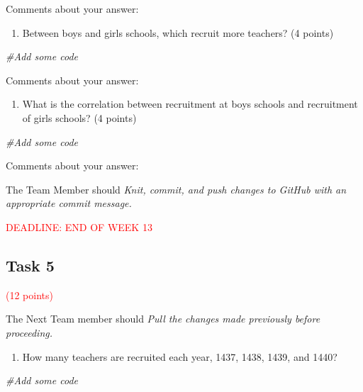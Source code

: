 \documentclass[
]{article}
\newenvironment{Shaded}{\begin{snugshade}}{\end{snugshade}}
\newcommand{\CommentTok}[1]{\textcolor[rgb]{0.56,0.35,0.01}{\textit{#1}}}
\providecommand{\tightlist}{%
  \setlength{\itemsep}{0pt}\setlength{\parskip}{0pt}}
\begin{document}
Comments about your answer:

\begin{enumerate}
\def\labelenumi{(\alph{enumi})}
\setcounter{enumi}{1}
\tightlist
\item
  Between boys and girls schools, which recruit more teachers? (4
  points)
\end{enumerate}

\begin{Shaded}
\begin{Highlighting}[]
\CommentTok{\#Add some code}
\end{Highlighting}
\end{Shaded}

Comments about your answer:

\begin{enumerate}
\def\labelenumi{(\alph{enumi})}
\setcounter{enumi}{2}
\tightlist
\item
  What is the correlation between recruitment at boys schools and
  recruitment of girls schools? (4 points)
\end{enumerate}

\begin{Shaded}
\begin{Highlighting}[]
\CommentTok{\#Add some code}
\end{Highlighting}
\end{Shaded}

Comments about your answer:

The Team Member should \emph{Knit, commit, and push changes to GitHub
with an appropriate commit message.}

\textcolor{red}{DEADLINE: END OF WEEK 13}

\hypertarget{task-5}{%
\subsection{Task 5}\label{task-5}}

\textcolor{red}{(12 points)}

The Next Team member should \emph{Pull the changes made previously
before proceeding.}

\begin{enumerate}
\def\labelenumi{(\alph{enumi})}
\tightlist
\item
  How many teachers are recruited each year, 1437, 1438, 1439, and 1440?
\end{enumerate}

\begin{Shaded}
\begin{Highlighting}[]
\CommentTok{\#Add some code}
\end{Highlighting}
\end{Shaded}
\end{document}

